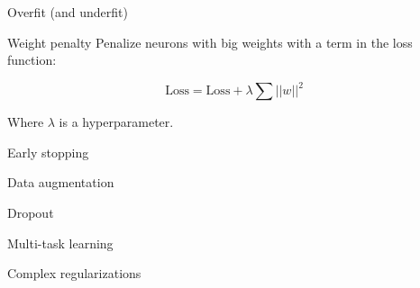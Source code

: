 \begin{frame}{Overfit (and underfit)}
\end{frame}

\begin{frame}{Weight penalty}
  Penalize neurons with big weights with a term in the loss function:

  \[
  \text{Loss} = \text{Loss} + \lambda\sum||w||^2
  \]

  Where $\lambda$ is a hyperparameter.
\end{frame}

\begin{frame}{Early stopping}
\end{frame}

\begin{frame}{Data augmentation}
\end{frame}

\begin{frame}{Dropout}
\end{frame}

\begin{frame}{Multi-task learning}
\end{frame}

\begin{frame}{Complex regularizations}
\end{frame}
